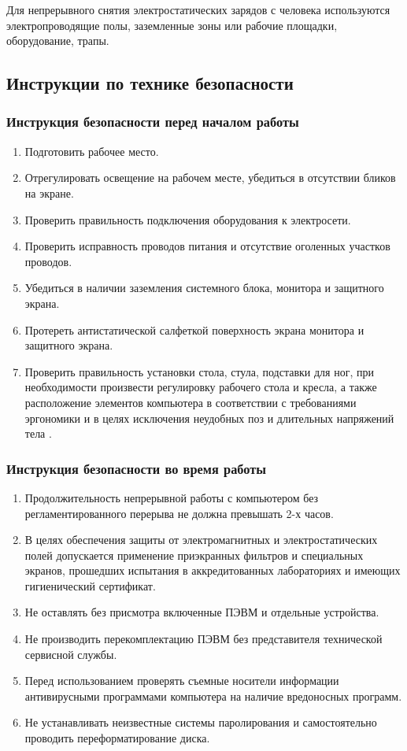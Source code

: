 Для непрерывного снятия электростатических зарядов с человека используются электропроводящие полы, заземленные зоны или рабочие площадки, оборудование, трапы.

\subsection{Инструкции по технике безопасности}

\subsubsection{Инструкция безопасности перед началом работы}

\begin{enumerate}
 \item Подготовить рабочее место.
 \item Отрегулировать освещение на рабочем месте, убедиться в отсутствии бликов на экране.
 \item Проверить правильность подключения оборудования к электросети.
 \item Проверить исправность проводов питания и отсутствие оголенных участков проводов.
 \item Убедиться в наличии заземления системного блока, монитора и защитного экрана.
 \item Протереть антистатической салфеткой поверхность экрана монитора и защитного экрана.
 \item Проверить правильность установки стола, стула, подставки для ног, при необходимости произвести регулировку рабочего стола и кресла, а также расположение элементов компьютера в соответствии с требованиями эргономики и в целях исключения неудобных поз и длительных напряжений тела \cite{OT3}.
\end{enumerate}

\subsubsection{Инструкция безопасности во время работы}

\begin{enumerate}
 \item Продолжительность непрерывной работы с компьютером без регламентированного перерыва не должна превышать 2-х часов.
 \item В целях обеспечения защиты от электромагнитных и электростатических полей допускается применение приэкранных фильтров и специальных экранов, прошедших испытания в аккредитованных лабораториях и имеющих гигиенический сертификат.
 \item Не оставлять без присмотра включенные ПЭВМ и отдельные устройства.
 \item Не производить перекомплектацию ПЭВМ без представителя технической сервисной службы.
 \item Перед использованием проверять съемные носители информации антивирусными программами компьютера на наличие вредоносных программ.
 \item Не устанавливать неизвестные системы паролирования и самостоятельно проводить переформатирование диска.
\end{enumerate}

